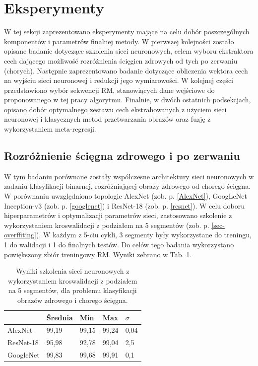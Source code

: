 \section{Eksperymenty}
\label{seq:experiments}
W tej sekcji zaprezentowano eksperymenty mające na celu dobór poszczególnych komponentów i parametrów finalnej metody. W pierwszej kolejności zostało opisane badanie dotyczące szkolenia sieci neuronowych, celem wyboru ekstraktora cech dającego możliwość rozróżnienia ścięgien zdrowych od tych po zerwaniu (chorych). Następnie zaprezentowano badanie dotyczące obliczenia wektora cech na wyjściu sieci neuronowej i redukcji jego wymiarowości. W kolejnej części przedstawiono wybór sekwencji RM, stanowiących dane wejściowe do proponowanego w tej pracy algorytmu. Finalnie, w dwóch ostatnich podsekcjach, opisano dobór optymalnego zestawu cech ekstrahowanych z użyciem sieci neuronowej i klasycznych metod przetwarzania obrazów oraz fuzję z wykorzystaniem meta-regresji.  


\subsection{Rozróżnienie ścięgna zdrowego i po zerwaniu}
\label{binaryMRI}
W tym badaniu porównane zostały współczesne architektury sieci neuronowych w zadaniu klasyfikacji binarnej, rozróżniającej obrazy zdrowego od chorego ścięgna. W porównaniu uwzględniono topologie AlexNet (zob. p. \ref{AlexNet}), GoogLeNet Inception-v3 (zob. p. \ref{googlenet}) i ResNet-18 (zob. p. \ref{resnet}). W celu doboru hiperparametrów i optymalizacji parametrów sieci, zastosowano szkolenie z wykorzystaniem kroswalidacji z podziałem na 5 segmentów (zob. p. \ref{sec-overffiting}). W każdym z 5-ciu cykli, 3 segmenty były wykorzystane do treningu, 1 do walidacji i 1 do finalnych testów. Do celów tego badania wykorzystano powiększony zbiór treningowy RM. Wyniki zebrano w Tab. \ref{tab:binary-cross-validation}.
\vspace{10px}
\renewcommand{\arraystretch}{1.2}
\begin{table}[h!]
	\setlength{\tabcolsep}{14pt}
	\centering
	\caption{Wyniki szkolenia sieci neuronowych z wykorzystaniem kroswalidacji z podziałem na 5 segmentów, dla problemu klasyfikacji obrazów zdrowego i chorego ścięgna.}
	\label{tab:binary-cross-validation}
	\begin{tabular}{l | l | l | l | l }
		 & Średnia & Min   & Max   & $\sigma$   \\ \hline \hline
		AlexNet   & 99,19 & 99,15 & 99,24 & 0,04 \\ \hline
		ResNet-18 & 95,98 & 92,78 & 99,04 & 2,5  \\ \hline
		GoogleNet & 99,83 & 99,68 & 99,91 & 0,1  \\ \hline
	\end{tabular}
\end{table}
\renewcommand{\arraystretch}{1}

